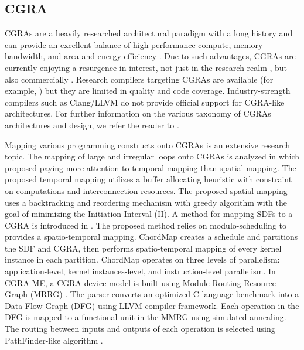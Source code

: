 \subsection{CGRA}
CGRAs are a heavily researched architectural paradigm with a long history and can provide an excellent balance of high-performance compute, memory bandwidth, and area and energy efficiency \cite{theodoridis2007survey}.
Due to such advantages, CGRAs are currently enjoying a resurgence in interest, not just in the research realm \cite{prabhakar2018plasticine}, but also commercially \cite{morgan2018intel, nicol2017coarse, vissers2019versal}.
Research compilers targeting CGRAs are available (for example, \cite{adriaansen2016code, chin_cgra-me_2017, mei2003exploiting, prabhakar2018plasticine}) but they are limited in quality and code coverage. 
Industry-strength compilers such as Clang/LLVM do not provide official support for CGRA-like architectures.
For further information on the various taxonomy of CGRAs architectures and design, we refer the reader to \cite{liu_survey_2019, tehre_survey_2012}.

Mapping various programming constructs onto CGRAs is an extensive research topic.
The  mapping of large and irregular loops onto CGRAs is analyzed in \cite{zhao_towards_2020} which proposed paying more attention to temporal mapping than spatial mapping. 
The proposed temporal mapping utilizes a buffer allocating heuristic with constraint on computations and interconnection resources. 
The proposed spatial mapping uses a backtracking and reordering mechanism with greedy algorithm with the goal of minimizing the Initiation Interval (II).
A method for mapping SDFs to a CGRA is introduced in \cite{li_chordmap_2022}.
The proposed method relies on modulo-scheduling to provides a spatio-temporal mapping.
ChordMap creates a schedule and partitions the SDF and CGRA, then performs spatio-temporal mapping of every kernel instance in each partition.
ChordMap operates on three levels of parallelism: application-level, kernel instances-level, and instruction-level parallelism.
In CGRA-ME\cite{chin_cgra-me_2017}, a CGRA device model is built using Module Routing Resource Graph (MRRG) \cite{mrrg}. 
The parser converts an optimized C-language benchmark into a Data Flow Graph (DFG) using LLVM compiler framework. 
Each operation in the DFG is mapped to a functional unit in the MMRG using simulated annealing. 
The routing between inputs and outputs of each operation is selected using PathFinder-like algorithm \cite{pathfinder}.

